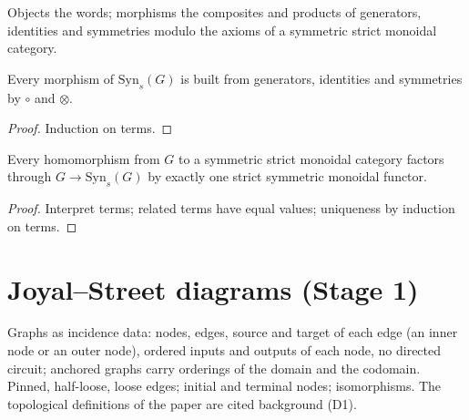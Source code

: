 \begin{definition}
\label{syn:def}
\leanok
{}
Objects the words; morphisms the composites and products of generators,
identities and symmetries modulo the axioms of a symmetric strict monoidal
category.
\end{definition}

\begin{theorem}[Generation]
\label{syn:generation}
\leanok
{}
Every morphism of $\mathrm{Syn}_s(G)$ is built from generators, identities and
symmetries by $\circ$ and $\otimes$.
\end{theorem}

\begin{proof}
\leanok
Induction on terms.
\end{proof}

\begin{theorem}
\label{syn:universal}
\leanok
{}
Every homomorphism from $G$ to a symmetric strict monoidal category factors
through $G \to \mathrm{Syn}_s(G)$ by exactly one strict symmetric monoidal functor.
\end{theorem}

\begin{proof}
\leanok
Interpret terms; related terms have equal values; uniqueness by induction on terms.
\end{proof}

\section{Joyal--Street diagrams (Stage 1)}

\begin{definition}
\label{def:2.graphs}
\leanok
Graphs as incidence data: nodes, edges, source and target of each edge (an inner
node or an outer node), ordered inputs and outputs of each node, no directed
circuit; anchored graphs carry orderings of the domain and the codomain. Pinned,
half-loose, loose edges; initial and terminal nodes; isomorphisms. The
topological definitions of the paper are cited background (D1).
\end{definition}

